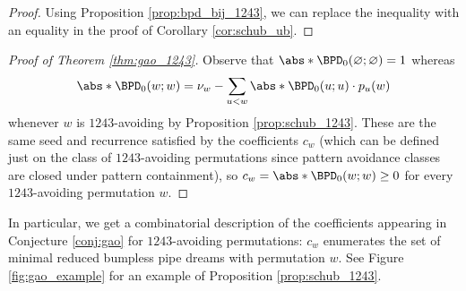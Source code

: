 \begin{proof}
    Using Proposition \ref{prop:bpd_bij_1243}, we can replace the inequality with an equality in the proof of Corollary \ref{cor:schub_ub}.
\end{proof}

\begin{proof}[Proof of Theorem \ref{thm:gao_1243}]
Observe that $\abs*{\BPD_0(\varnothing;\varnothing)} = 1$ whereas \[
    \abs*{\BPD_0(w;w)}
    = \nu_w - \sum_{u<w} \abs*{\BPD_0(u;u)}\cdot p_u(w)
\] whenever $w$ is $1243$-avoiding by Proposition \ref{prop:schub_1243}.
These are the same seed and recurrence satisfied by the coefficients $c_w$ (which can be defined just on the class of $1243$-avoiding permutations since pattern avoidance classes are closed under pattern containment), so $c_w = \abs*{\BPD_0(w;w)} \geq 0$ for every $1243$-avoiding permutation $w$.
\end{proof}

In particular, we get a combinatorial description of the coefficients appearing in Conjecture \ref{conj:gao} for $1243$-avoiding permutations:
$c_w$ enumerates the set of minimal reduced bumpless pipe dreams with permutation $w$.
See Figure \ref{fig:gao_example} for an example of Proposition \ref{prop:schub_1243}.

